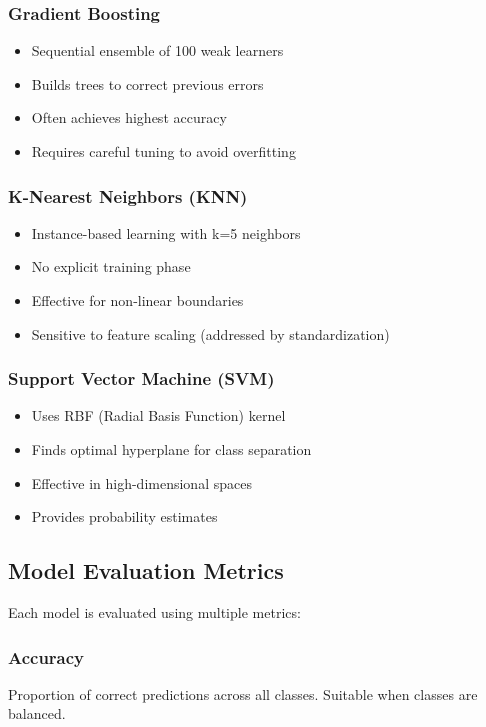 \documentclass[12pt,a4paper]{report}
\begin{document}
\subsubsection{Gradient Boosting}
\begin{itemize}
    \item Sequential ensemble of 100 weak learners
    \item Builds trees to correct previous errors
    \item Often achieves highest accuracy
    \item Requires careful tuning to avoid overfitting
\end{itemize}

\subsubsection{K-Nearest Neighbors (KNN)}
\begin{itemize}
    \item Instance-based learning with k=5 neighbors
    \item No explicit training phase
    \item Effective for non-linear boundaries
    \item Sensitive to feature scaling (addressed by standardization)
\end{itemize}


\subsubsection{Support Vector Machine (SVM)}
\begin{itemize}
    \item Uses RBF (Radial Basis Function) kernel
    \item Finds optimal hyperplane for class separation
    \item Effective in high-dimensional spaces
    \item Provides probability estimates
\end{itemize}

\subsection{Model Evaluation Metrics}
\noindent Each model is evaluated using multiple metrics:

\subsubsection{Accuracy}
Proportion of correct predictions across all classes. Suitable when classes are balanced.
\end{document}
